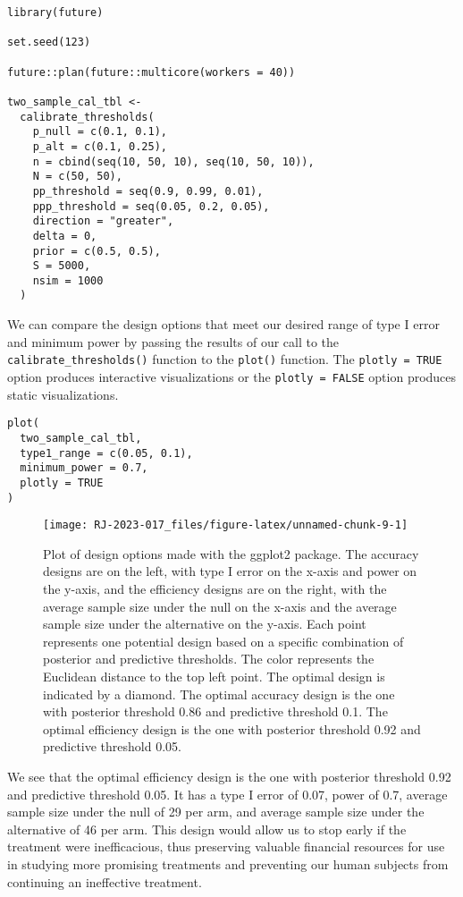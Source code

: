 \begin{verbatim}
library(future)

set.seed(123)

future::plan(future::multicore(workers = 40))

two_sample_cal_tbl <- 
  calibrate_thresholds(
    p_null = c(0.1, 0.1), 
    p_alt = c(0.1, 0.25),
    n = cbind(seq(10, 50, 10), seq(10, 50, 10)),
    N = c(50, 50), 
    pp_threshold = seq(0.9, 0.99, 0.01),
    ppp_threshold = seq(0.05, 0.2, 0.05),
    direction = "greater", 
    delta = 0, 
    prior = c(0.5, 0.5), 
    S = 5000, 
    nsim = 1000
  )
\end{verbatim}

We can compare the design options that meet our desired range of type I error and minimum power by passing the results of our call to the \texttt{calibrate\_thresholds()} function to the \texttt{plot()} function. The \texttt{plotly\ =\ TRUE} option produces interactive visualizations or the \texttt{plotly\ =\ FALSE} option produces static visualizations.

\begin{verbatim}
plot(
  two_sample_cal_tbl, 
  type1_range = c(0.05, 0.1), 
  minimum_power = 0.7,
  plotly = TRUE
)
\end{verbatim}

\begin{figure}
\texttt{[image: RJ-2023-017\_files/figure-latex/unnamed-chunk-9-1]} \caption{Plot of design options made with the {ggplot2} package. The accuracy designs are on the left, with type I error on the x-axis and power on the y-axis, and the efficiency designs are on the right, with the average sample size under the null on the x-axis and the average sample size under the alternative on the y-axis. Each point represents one potential design based on a specific combination of posterior and predictive thresholds. The color represents the Euclidean distance to the top left point. The optimal design is indicated by a diamond. The optimal accuracy design is the one with posterior threshold 0.86 and predictive threshold 0.1. The optimal efficiency design is the one with posterior threshold 0.92 and predictive threshold 0.05.}\label{fig:unnamed-chunk-9}
\end{figure}

We see that the optimal efficiency design is the one with posterior threshold 0.92 and predictive threshold 0.05. It has a type I error of 0.07, power of 0.7, average sample size under the null of 29 per arm, and average sample size under the alternative of 46 per arm. This design would allow us to stop early if the treatment were inefficacious, thus preserving valuable financial resources for use in studying more promising treatments and preventing our human subjects from continuing an ineffective treatment.

